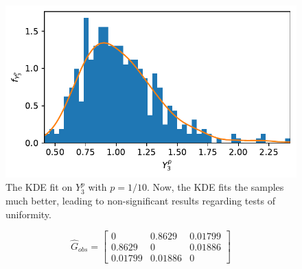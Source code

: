 \documentclass[../Thesis.tex]{subfiles}
\begin{document}
\begin{figure}[H]
    \centering
    \includegraphics[width=0.7\linewidth]{figures/ND examples/Gaussian 3x3 large s power X3 KDE.pdf}
    \caption{The KDE fit on $Y_3^p$ with $p = 1/10$. Now, the KDE fits the samples much better, leading to non-significant results regarding tests of uniformity.}
    \label{fig:Gaussian 3x3 large s power X3 KDE}
\end{figure}

\begin{equation}\label{eq:G_obs hat power transformed Y - 3x3}
    \hat{G}_{obs} = \begin{bmatrix}
        0       & 0.8629  & 0.01799 \\
        0.8629  & 0       & 0.01886 \\
        0.01799 & 0.01886 & 0
    \end{bmatrix}
\end{equation}


\end{document}

